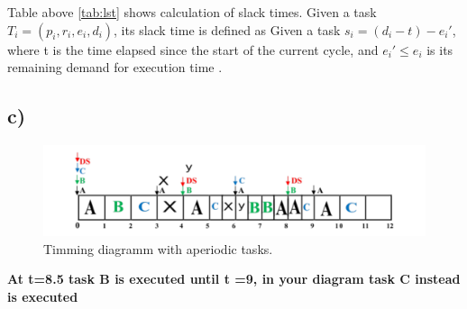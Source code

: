 \documentclass[10pt,a4paper]{article}
\begin{document}
Table above \ref{tab:lst} shows calculation of slack times. Given a task $T_i = (p_i,r_i,e_i,d_i)$, its slack time is defined as Given a task $s_i = (d_i - t) - e_i'$, where t is the time elapsed since the start of the current cycle, and $e_i' \leq e_i$ is its remaining demand for execution time \cite{Fan:2015:RES:2800613}.
\subsection*{c)}

\begin{figure}[h]
\includegraphics[width=\linewidth]{1c.pdf}
\caption{Timming diagramm with aperiodic tasks.} 
\label{fig:1c}
\end{figure}
\newpage

\textbf{At t=8.5 task B is executed until t =9, in your diagram task C instead is executed}
\end{document}
